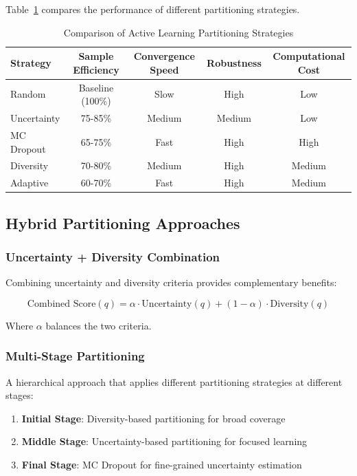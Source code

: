 Table~\ref{tab:partitioning_comparison} compares the performance of different partitioning strategies.

\begin{table}[h]
\centering
\caption{Comparison of Active Learning Partitioning Strategies}
\label{tab:partitioning_comparison}
\begin{tabular}{|l|c|c|c|c|}
\hline
Strategy & Sample Efficiency & Convergence Speed & Robustness & Computational Cost \\
\hline
Random & Baseline (100\%) & Slow & High & Low \\
Uncertainty & 75-85\% & Medium & Medium & Low \\
MC Dropout & 65-75\% & Fast & High & High \\
Diversity & 70-80\% & Medium & High & Medium \\
Adaptive & 60-70\% & Fast & High & Medium \\
\hline
\end{tabular}
\end{table}

\subsection{Hybrid Partitioning Approaches}

\subsubsection{Uncertainty + Diversity Combination}

Combining uncertainty and diversity criteria provides complementary benefits:

\begin{equation}
\text{Combined Score}(q) = \alpha \cdot \text{Uncertainty}(q) + (1 - \alpha) \cdot \text{Diversity}(q)
\end{equation}

Where $\alpha$ balances the two criteria.

\subsubsection{Multi-Stage Partitioning}

A hierarchical approach that applies different partitioning strategies at different stages:

\begin{enumerate}
    \item \textbf{Initial Stage}: Diversity-based partitioning for broad coverage
    \item \textbf{Middle Stage}: Uncertainty-based partitioning for focused learning
    \item \textbf{Final Stage}: MC Dropout for fine-grained uncertainty estimation
\end{enumerate}

